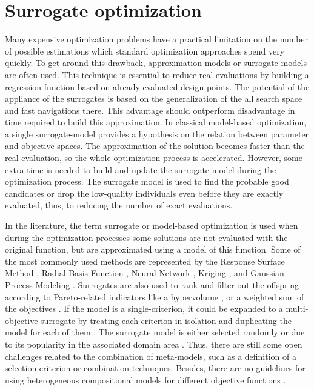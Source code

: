     \section{Surrogate optimization} 
        Many expensive optimization problems have a practical limitation on the number of possible estimations which standard optimization approaches spend very quickly. To get around this drawback, approximation models or surrogate models are often used. This technique is essential to reduce real evaluations by building a regression function based on already evaluated design points.
        The potential of the appliance of the surrogates is based on the generalization of the all search space and fast navigations there. This advantage should outperform disadvantage in time required to build this approximation. In classical model-based optimization, a single surrogate-model provides a hypothesis on the relation between parameter and objective spaces. The approximation of the solution becomes faster than the real evaluation, so the whole optimization process is accelerated. However, some extra time is needed to build and update the surrogate model during the optimization process. The surrogate model is used to find the probable good candidates or drop the low-quality individuals even before they are exactly evaluated, thus, to reducing the number of exact evaluations.

        In the literature, the term surrogate or model-based optimization is used when during the optimization processes some solutions are not evaluated with the original function, but are approximated using a model of this function. Some of the most commonly used methods are represented by the Response Surface Method \cite{ResponseSurface}, Radial Basis Function \cite{Rasmussen2004}, Neural Network \cite{KOURAKOS201313}, Kriging \cite{Woodard00}, and Gaussian Process Modeling \cite{RasmussenN10, RasmussenW06}. Surrogates are also used to rank and filter out the offspring according to Pareto-related indicators like a hypervolume \cite{EmmerichGN06}, or a weighted sum of the objectives \cite{TaboadaBCW07}. If the model is a single-criterion, it could be expanded to a multi-objective surrogate by treating each criterion in isolation and duplicating the model for each of them \cite{Knowles06, nardi2019practical}. The surrogate model is either selected randomly or due to its popularity in the associated domain area \cite{SoftSurvey}. Thus, there are still some open challenges related to the combination of meta-models, such as a definition of a selection criterion or combination techniques. Besides, there are no guidelines for using heterogeneous compositional models for different objective functions \cite{SoftSurvey}.

